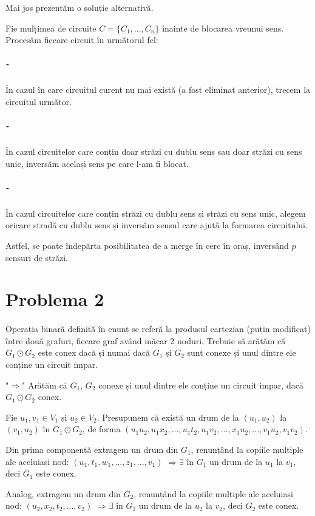 \documentclass[paper=a4, fontsize=12pt]{scrartcl}
\begin{document}
\bigskip
Mai jos prezentăm o soluție alternativă.

Fie mulțimea de circuite $C = \{C_1, ..., C_n\}$ înainte de blocarea vreunui sens.
Procesăm fiecare circuit în următorul fel:
\vspace{-1.3em}
\subparagraph{-}
În cazul în care circuitul curent nu mai există (a fost eliminat anterior), trecem la circuitul următor.
\vspace{-1.3em}
\subparagraph{-}
În cazul circuitelor care conțin doar străzi cu dublu sens sau doar 
străzi cu sens unic, inversăm același sens pe care l-am fi blocat.
\vspace{-1.3em}
\subparagraph{-}
În cazul circuitelor care conțin străzi cu dublu sens și străzi cu 
sens unic, alegem oricare stradă cu dublu sens și inversăm sensul care 
ajută la formarea circuitului.

Astfel, se poate îndepărta posibilitatea de a merge în cerc în oraș, 
inversând $p$ sensuri de străzi.

\section*{Problema 2}
\paragraph{}
Operația binară definită în enunț se referă la produsul cartezian (puțin modificat) între două grafuri, fiecare graf având măcar 2 noduri.
Trebuie să arătăm că $G_1 \odot G_2$ este conex dacă și numai dacă $G_1$ și $G_2$ sunt conexe și unul dintre ele conține un circuit impar.

"$\Rightarrow$" Arătăm că $G_1$, $G_2$ conexe și unul dintre ele conține un circuit impar, dacă $G_1 \odot G_2$ conex.

Fie $u_1, v_1 \in V_1$ și $u_2 \in V_2$.
Presupunem că există un drum de la $(u_1, u_2)$ la $(v_1, u_2)$ în $G_1 \odot G_2$, de forma
$(u_1u_2, u_1x_2, ..., u_1t_2, u_1v_2, ..., x_1u_2, ..., v_1u_2, v_1v_2)$.

Din prima componentă extragem un drum din $G_1$, renunțând la copiile multiple ale aceluiași nod: $(u_1, t_1, w_1, ..., z_1, ..., v_1)$
$\Rightarrow \exists$ în $G_1$ un drum de la $u_1$ la $v_1$, deci $G_1$ este conex.

Analog, extragem un drum din $G_2$,  renunțând la copiile multiple ale aceluiași nod: $(u_2, x_2, t_2, ...,v_2)$
$\Rightarrow \exists$ în $G_2$ un drum de la $u_2$ la $v_2$, deci $G_2$ este conex.
\end{document}
